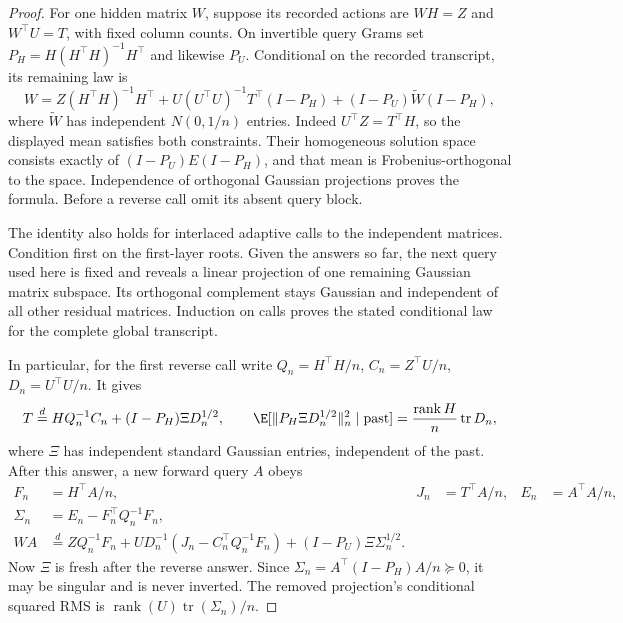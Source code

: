\begin{proof}
For one hidden matrix $W$, suppose its recorded actions are $WH=Z$ and
$W^\top U=T$, with fixed column counts. On invertible query Grams set
$P_H=H(H^\top H)^{-1}H^\top$ and likewise $P_U$. Conditional on the
recorded transcript, its remaining law is
\begin{equation}
 W=Z(H^\top H)^{-1}H^\top
    +U(U^\top U)^{-1}T^\top(I-P_H)
    +(I-P_U)\widetilde W(I-P_H),
 \label{fl:two-sided-conditioning}
\end{equation}
where $\widetilde W$ has independent $N(0,1/n)$ entries. Indeed
$U^\top Z=T^\top H$, so the displayed mean satisfies both constraints.
Their homogeneous solution space consists exactly of
$(I-P_U)E(I-P_H)$, and that mean is Frobenius-orthogonal to the space.
Independence of orthogonal Gaussian projections proves the formula.
Before a reverse call omit its absent query block.

The identity also holds for interlaced adaptive calls to the independent
matrices. Condition first on the first-layer roots. Given the answers so
far, the next query used here is fixed and reveals a linear projection of
one remaining Gaussian matrix subspace. Its orthogonal complement stays
Gaussian and independent of all other residual matrices. Induction on calls
proves the stated conditional law for the complete global transcript.

In particular, for the first reverse call write
$Q_n=H^\top H/n$, $C_n=Z^\top U/n$, $D_n=U^\top U/n$. It gives
\begin{equation}
 T\overset d=H Q_n^{-1}C_n+(I-P_H)\Xi D_n^{1/2},
 \qquad
 \E[\|P_H\Xi D_n^{1/2}\|_n^2\mid\mathrm{past}]
   =\frac{\operatorname{rank}H}{n}\operatorname{tr}D_n,
 \label{fl:reverse-conditioning}
\end{equation}
where $\Xi$ has independent standard Gaussian entries, independent of the
past. After this answer, a new forward query $A$ obeys
\begin{align}
 F_n&=H^\top A/n,&J_n&=T^\top A/n,&E_n&=A^\top A/n,\nonumber\\
 \Sigma_n&=E_n-F_n^\top Q_n^{-1}F_n,\nonumber\\
 WA&\overset d=ZQ_n^{-1}F_n
  +UD_n^{-1}(J_n-C_n^\top Q_n^{-1}F_n)
  +(I-P_U)\Xi\Sigma_n^{1/2}.
 \label{fl:acceleration-conditioning}
\end{align}
Now $\Xi$ is fresh after the reverse answer. Since
$\Sigma_n=A^\top(I-P_H)A/n\succeq0$, it may be singular and is never
inverted. The removed projection's conditional squared RMS is
$\operatorname{rank}(U)\operatorname{tr}(\Sigma_n)/n$.


\end{proof}
